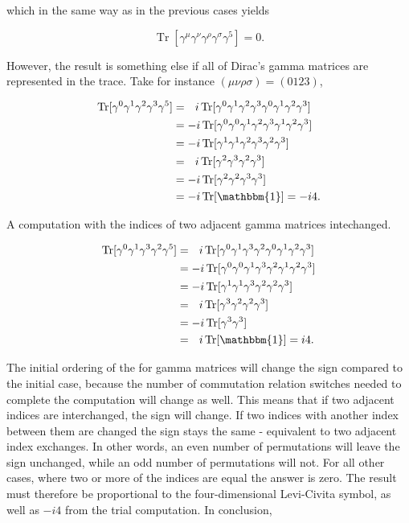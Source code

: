 \documentclass[11pt, a4paper]{amsart}
\DeclareMathOperator{\Tr}{Tr}
\begin{document}
which in the same way as in the previous cases yields

\begin{equation}
\Tr[\gamma^\mu\gamma^\nu\gamma^\rho\gamma^\sigma\gamma^5] = 0.
\end{equation}

However, the result is something else if all of Dirac's gamma matrices are represented in the trace. Take for instance $(\mu\nu\rho\sigma) = (0123)$,

\begin{align}
\Tr[\gamma^0\gamma^1\gamma^2\gamma^3\gamma^5]
   &= \ \ i\Tr[\gamma^0\gamma^1\gamma^2\gamma^3\gamma^0\gamma^1\gamma^2\gamma^3] \\
   &= - i\Tr[\gamma^0\gamma^0\gamma^1\gamma^2\gamma^3\gamma^1\gamma^2\gamma^3] \\
   &= - i\Tr[\gamma^1\gamma^1\gamma^2\gamma^3\gamma^2\gamma^3] \\
   &= \ \ i\Tr[\gamma^2\gamma^3\gamma^2\gamma^3] \\
   &= - i\Tr[\gamma^2\gamma^2\gamma^3\gamma^3] \\
   &= - i\Tr[\mathbbm{1}] = -i4.
\end{align}

A computation with the indices of two adjacent gamma matrices intechanged.

\begin{align}
\Tr[\gamma^0\gamma^1\gamma^3\gamma^2\gamma^5]
   &= \ \ i\Tr[\gamma^0\gamma^1\gamma^3\gamma^2\gamma^0\gamma^1\gamma^2\gamma^3] \\
   &= - i\Tr[\gamma^0\gamma^0\gamma^1\gamma^3\gamma^2\gamma^1\gamma^2\gamma^3] \\
   &= - i\Tr[\gamma^1\gamma^1\gamma^3\gamma^2\gamma^2\gamma^3] \\
   &= \ \ i\Tr[\gamma^3\gamma^2\gamma^2\gamma^3] \\
   &= - i\Tr[\gamma^3\gamma^3] \\
   &= \ \  i\Tr[\mathbbm{1}] = i4.
\end{align}

The initial ordering of the for gamma matrices will change the sign compared to the initial case, because the number of commutation relation switches needed to complete the computation will change as well. This means that if two adjacent indices are interchanged, the sign will change. If two indices with another index between them are changed the sign stays the same - equivalent to two adjacent index exchanges. In other words, an even number of permutations will leave the sign unchanged, while an odd number of permutations will not. For all other cases, where two or more of the indices are equal the answer is zero. The result must therefore be proportional to the four-dimensional Levi-Civita symbol, as well as $-i4$ from the trial computation. In conclusion,
\end{document}

